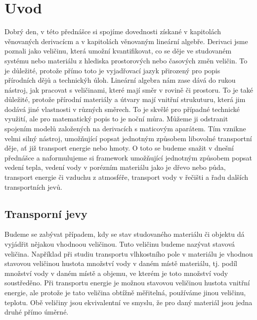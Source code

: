 \documentclass[12pt]{article}
\begin{document}
\section*{Uvod}

Dobrý den, v této přednášce si spojíme dovednosti získané v kapitolách věnovaných derivacícm a v kapitolách věnovaným lineární algebře. Derivaci jsme poznali jako veličinu, která umožní kvantifikovat, co se děje ve studovaném systému nebo materiálu z hlediska prostorových nebo časových změn veličin. To je
důležité, protože přímo toto je vyjadřovací jazyk přirozený pro popis přírodních dějů a technickýh úloh. Lineární algebra nám zase dává do rukou nástroj, jak pracovat s veličinami, které mají směr v rovině či prostoru. To je také důležité, protože přírodní materiály a útvary mají vnitřní strukuturu, která jim dodává jiné vlastnosti v různých směrech. To je skvělé pro případné technické využití, ale pro matematický popis to je noční můra. Můžeme ji odstranit spojením modelů založených na derivacích s maticovým aparátem. Tím vznikne velmi silný nástroj, umožňující popsat jednotným způsobem libovolné transportní děje, ať již transport energie nebo hmoty. O toto se budeme snažit v dnešní přednášce a naformulujeme si framework umožňující jednotným způsobem popsat vedení tepla, vedení vody v porézním materiálu jako je dřevo nebo půda, transport energie či vzduchu z atmosféře, transport vody v řečišti a řadu dalších transportních jevů.



\subsection{Transporní jevy}

Budeme se zabývat případem, kdy se stav studovaného materiálu či objektu dá vyjádřit nějakou vhodnoou veličinou. Tuto veličinu budeme nazývat stavová veličina. Například při studiu transportu vlhkostního pole v materiálu je vhodnou stavovou veličinou hustota množství vody v daném místě materiálu, tj. podíl množství vody v daném místě a objemu, ve kterém je toto množství vody soustředěno. Při transportu energie je možnou stavovou veličinou hustota vnitřní energie, ale protože je tato veličina obtížně měřitelná, používáme jinou veličinu, teplotu. Obě veličiny jsou ekvivalentní ve smyslu, že pro daný materiál jsou jedna druhé přímo úměrné. 
\end{document}
